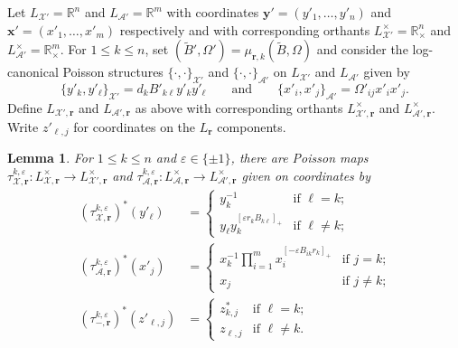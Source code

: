 \documentclass{amsart}
\newtheorem{lemma}[theorem]{Lemma}
\numberwithin{equation}{section}
\newcommand{\bfr}{{\boldsymbol{r}}}
\newcommand{\bfx}{{\boldsymbol{x}}}
\newcommand{\bfy}{{\boldsymbol{y}}}
\newcommand{\cA}{\mathcal{A}}
\newcommand{\cX}{\mathcal{X}}
\newcommand{\RR}{\mathbb{R}}
\begin{document}
Let $L_{\cX'}=\RR^n$ and $L_{\cA'}=\RR^m$ with coordinates $\bfy'=(y'_1,\ldots,y'_n)$ and $\bfx'=(x'_1,\ldots,x'_m)$ respectively and with corresponding orthants $L^\times_{\cX'}=\RR_\times^n$ and $L^\times_{\cA'}=\RR_\times^m$.
For $1\le k\le n$, set $(\tilde B',\Omega')=\mu_{\bfr,k}(\tilde B,\Omega)$ and consider the log-canonical Poisson structures $\{\cdot,\cdot\}_{\cX'}$ and $\{\cdot,\cdot\}_{\cA'}$ on $L_{\cX'}$ and $L_{\cA'}$ given by
\begin{equation*}
  \{y'_k,y'_\ell\}_{\cX'}=d_kB'_{k\ell}y'_ky'_\ell\qquad\text{and}\qquad\{x'_i,x'_j\}_{\cA'}=\Omega'_{ij}x'_ix'_j.
\end{equation*}
Define $L_{\cX',\bfr}$ and $L_{\cA',\bfr}$ as above with corresponding orthants $L^\times_{\cX',\bfr}$ and $L^\times_{\cA',\bfr}$.
Write $z'_{\ell,j}$ for coordinates on the $L_\bfr$ components.
\begin{lemma}
  \label{le:tropical cluster transformations}
  For $1\le k\le n$ and $\varepsilon\in\{\pm1\}$, there are Poisson maps $\tau_{\cX,\bfr}^{k,\varepsilon}:L^\times_{\cX,\bfr}\to L^\times_{\cX',\bfr}$ and $\tau_{\cA,\bfr}^{k,\varepsilon}:L^\times_{\cA,\bfr}\to L^\times_{\cA',\bfr}$ given on coordinates by
  \begin{align*}
    (\tau_{\cX,\bfr}^{k,\varepsilon})^*(y'_\ell)
    &=\begin{cases} 
      y_k^{-1} & \text{if $\ell=k$;}\\ 
      y_\ell y_k^{[\varepsilon r_kB_{k\ell}]_+} & \text{if $\ell\ne k$;}
    \end{cases}\\
    (\tau_{\cA,\bfr}^{k,\varepsilon})^*(x'_j)
    &=\begin{cases} 
      x_k^{-1}\prod\limits_{i=1}^m x_i^{[-\varepsilon B_{ik}r_k]_+} & \text{if $j=k$;}\\
      x_j & \text{if $j\ne k$;}
    \end{cases}\\
    (\tau_{-,\bfr}^{k,\varepsilon})^*(z'_{\ell,j})
    &=\begin{cases}
      z^*_{k,j} & \text{if $\ell=k$;}\\
      z_{\ell,j} & \text{if $\ell\ne k$.}
    \end{cases}  
  \end{align*}
\end{lemma}
\end{document}
